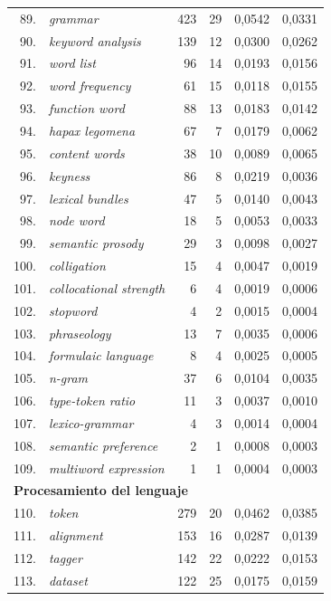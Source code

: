 \begin{longtable}{@{} r p{5cm} r r r r @{}}
89. & \textit{grammar} & 423 & 29 & 0{,}0542 & 0{,}0331 \\
90. & \textit{keyword analysis} & 139 & 12 & 0{,}0300 & 0{,}0262 \\
91. & \textit{word list} & 96 & 14 & 0{,}0193 & 0{,}0156 \\
92. & \textit{word frequency} & 61 & 15 & 0{,}0118 & 0{,}0155 \\
93. & \textit{function word} & 88 & 13 & 0{,}0183 & 0{,}0142 \\
94. & \textit{hapax legomena} & 67 & 7 & 0{,}0179 & 0{,}0062 \\
95. & \textit{content words} & 38 & 10 & 0{,}0089 & 0{,}0065 \\
96. & \textit{keyness} & 86 & 8 & 0{,}0219 & 0{,}0036 \\
97. & \textit{lexical bundles} & 47 & 5 & 0{,}0140 & 0{,}0043 \\
98. & \textit{node word} & 18 & 5 & 0{,}0053 & 0{,}0033 \\
99. & \textit{semantic prosody} & 29 & 3 & 0{,}0098 & 0{,}0027 \\
100. & \textit{colligation} & 15 & 4 & 0{,}0047 & 0{,}0019 \\
101. & \textit{collocational strength} & 6 & 4 & 0{,}0019 & 0{,}0006 \\
102. & \textit{stopword} & 4 & 2 & 0{,}0015 & 0{,}0004 \\
103. & \textit{phraseology} & 13 & 7 & 0{,}0035 & 0{,}0006 \\
104. & \textit{formulaic language} & 8 & 4 & 0{,}0025 & 0{,}0005 \\
105. & \textit{n-gram} & 37 & 6 & 0{,}0104 & 0{,}0035 \\
106. & \textit{type-token ratio} & 11 & 3 & 0{,}0037 & 0{,}0010 \\
107. & \textit{lexico-grammar} & 4 & 3 & 0{,}0014 & 0{,}0004 \\
108. & \textit{semantic preference} & 2 & 1 & 0{,}0008 & 0{,}0003 \\
109. & \textit{multiword expression} & 1 & 1 & 0{,}0004 & 0{,}0003 \\
\midrule
\multicolumn{6}{l}{\textbf{Procesamiento del lenguaje}} \\
\midrule
110. & \textit{token} & 279 & 20 & 0{,}0462 & 0{,}0385 \\
111. & \textit{alignment} & 153 & 16 & 0{,}0287 & 0{,}0139 \\
112. & \textit{tagger} & 142 & 22 & 0{,}0222 & 0{,}0153 \\
113. & \textit{dataset} & 122 & 25 & 0{,}0175 & 0{,}0159 \\

\end{longtable}
